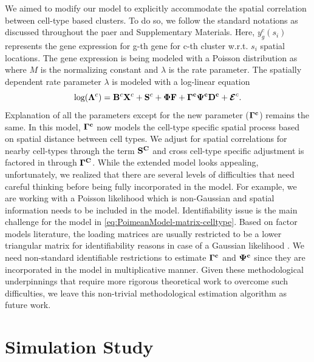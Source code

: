 \documentclass[
]{book}
\begin{document}
We aimed to modify our model to explicitly accommodate the spatial correlation between cell-type based clusters. To do so, we follow the standard notations as discussed throughout the paer and Supplementary Materials. Here, \(y^{c}_{g}(s_{i})\) represents the gene expression for g-th gene for c-th cluster w.r.t. \(s_{i}\) spatial locations. The gene expression is being modeled with a Poisson distribution as where \(M\) is the normalizing constant and \(\lambda\) is the rate parameter. The spatially dependent rate parameter \(\lambda\) is modeled with a log-linear equation
\begin{equation}
\text{log}({\bf \Lambda}^{c}) = {\bf B}^{c}{\bf X}^{c} + {\bf S}^{c} + {\bf \Phi F} + {\bf \Gamma^{c}} {\bf \Psi^{c} D^{c}} + {\boldsymbol{\mathcal{E}}}^{c}.
\label{eq:PoimeanModel-matrix-celltype}
\end{equation}
Explanation of all the parameters except for the new parameter (\(\bf \Gamma^{c}\)) remains the same. In this model, \(\bf \Gamma^{c}\) now models the cell-type specific spatial process based on spatial distance between cell types. We adjust for spatial correlations for nearby cell-types through the term \(\bf S^{C}\) and cross cell-type specific adjustment is factored in through \(\bf \Gamma^{C}\). While the extended model looks appealing, unfortunately, we realized that there are several levels of difficulties that need careful thinking before being fully incorporated in the model. For example, we are working with a Poisson likelihood which is non-Gaussian and spatial information needs to be included in the model. Identifiability issue is the main challenge for the model in \eqref{eq:PoimeanModel-matrix-celltype}. Based on factor models literature, the loading matrices are usually restricted to be a lower triangular matrix for identifiability reasons in case of a Gaussian likelihood \citep{geweke1996measuring, lopes2004bayesian}. We need non-standard identifiable restrictions to estimate \(\bf \Gamma^{c}\) and \(\bf \Psi^{c}\) since they are incorporated in the model in multiplicative manner. Given these methodological underpinnings that require more rigorous theoretical work to overcome such difficulties, we leave this non-trivial methodological estimation algorithm as future work.

\hypertarget{simulation}{%
\chapter{Simulation Study}\label{simulation}}
\end{document}
